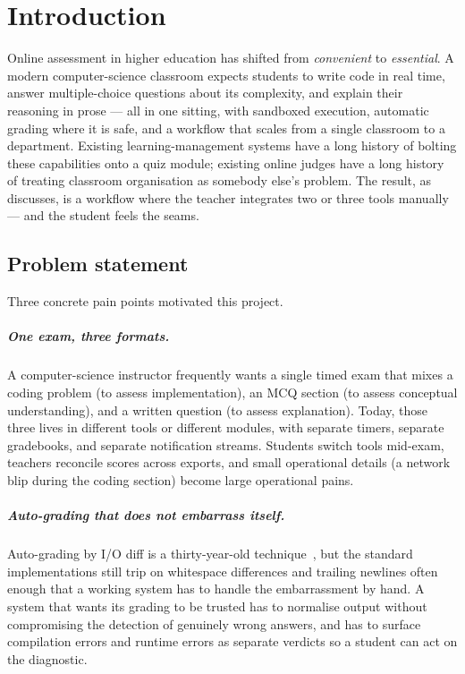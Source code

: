 \chapter{Introduction}
\label{ch:introduction}

Online assessment in higher education has shifted from \emph{convenient} to \emph{essential}. A modern computer-science classroom expects students to write code in real time, answer multiple-choice questions about its complexity, and explain their reasoning in prose --- all in one sitting, with sandboxed execution, automatic grading where it is safe, and a workflow that scales from a single classroom to a department. Existing learning-management systems have a long history of bolting these capabilities onto a quiz module; existing online judges have a long history of treating classroom organisation as somebody else's problem. The result, as  discusses, is a workflow where the teacher integrates two or three tools manually --- and the student feels the seams.

\section{Problem statement}

Three concrete pain points motivated this project.

\paragraph{One exam, three formats.} A computer-science instructor frequently wants a single timed exam that mixes a coding problem (to assess implementation), an MCQ section (to assess conceptual understanding), and a written question (to assess explanation). Today, those three lives in different tools or different modules, with separate timers, separate gradebooks, and separate notification streams. Students switch tools mid-exam, teachers reconcile scores across exports, and small operational details (a network blip during the coding section) become large operational pains.

\paragraph{Auto-grading that does not embarrass itself.} Auto-grading by I/O diff is a thirty-year-old technique~\cite{douce2005autoassess}, but the standard implementations still trip on whitespace differences and trailing newlines often enough that a working system has to handle the embarrassment by hand. A system that wants its grading to be trusted has to normalise output without compromising the detection of genuinely wrong answers, and has to surface compilation errors and runtime errors as separate verdicts so a student can act on the diagnostic.

